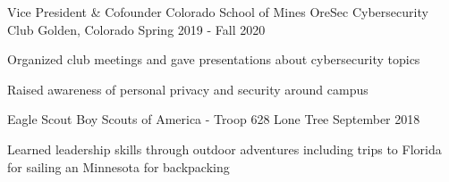 \vspace{-2.0mm}

\begin{cventries}

  \cventry
    {Vice President \& Cofounder} %
    {Colorado School of Mines OreSec Cybersecurity Club} %
    {Golden, Colorado} %
    {Spring 2019 - Fall 2020} %
    {
      \begin{cvitems} %
        \item {Organized club meetings and gave presentations about
            cybersecurity topics}
        \item {Raised awareness of personal privacy and security around campus}
      \end{cvitems}
    }

  \cventry
    {Eagle Scout} %
    {Boy Scouts of America - Troop 628} %
    {Lone Tree} %
    {September 2018} %
    {
      \begin{cvitems} %
        \item {Learned leadership skills through outdoor adventures
            including trips to Florida for sailing an Minnesota for
            backpacking}
      \end{cvitems}
    }

\end{cventries}

